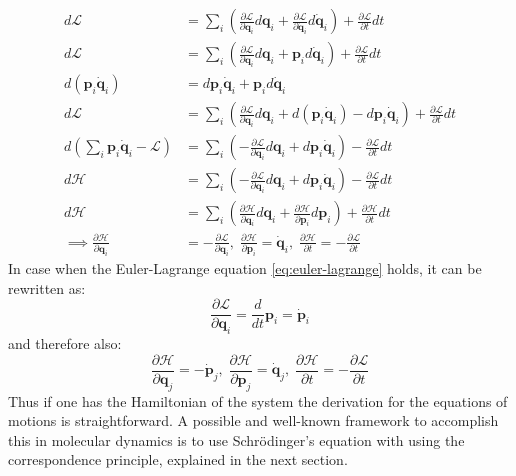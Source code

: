 \documentclass[12pt]{scrartcl}
\begin{document}
\begin{align*}
d\mathcal{L} &= \sum_{i} \left(  \frac{\partial \mathcal{L}}{\partial \mathbf{q}_i}d\mathbf{q}_i + \frac{\partial \mathcal{L}}{\partial \dot{\mathbf{q}}_i}d\dot{\mathbf{q}}_i  \right) + \frac{\partial \mathcal{L}}{\partial t} dt\\
d\mathcal{L} &= \sum_{i} \left(  \frac{\partial \mathcal{L}}{\partial \mathbf{q}_i}d\mathbf{q}_i + \mathbf{p}_id\dot{\mathbf{q}}_i  \right) + \frac{\partial \mathcal{L}}{\partial t} dt\\
d(\mathbf{p}_i\dot{\mathbf{q}}_i) &= d\mathbf{p}_i\dot{\mathbf{q}}_i+ \mathbf{p}_id\dot{\mathbf{q}}_i\\
d\mathcal{L} &= \sum_{i} \left(  \frac{\partial \mathcal{L}}{\partial \mathbf{q}_i}d\mathbf{q}_i +d(\mathbf{p}_i\dot{\mathbf{q}}_i) -  d\mathbf{p}_i\dot{\mathbf{q}}_i \right) + \frac{\partial \mathcal{L}}{\partial t} dt\\
d(\sum_{i} \mathbf{p}_i\dot{\mathbf{q}}_i - \mathcal{L})&=\sum_{i}\left(-\frac{\partial \mathcal{L}}{\partial \mathbf{q}_i}d\mathbf{q}_i +d\mathbf{p}_i\dot{\mathbf{q}}_i  \right)-\frac{\partial \mathcal{L}}{\partial t} dt \\
d\mathcal{H}&=\sum_{i}\left(-\frac{\partial \mathcal{L}}{\partial \mathbf{q}_i}d\mathbf{q}_i +d\mathbf{p}_i\dot{\mathbf{q}}_i  \right)-\frac{\partial \mathcal{L}}{\partial t} dt \\
d\mathcal{H}&=\sum_{i} \left(  \frac{\partial \mathcal{H}}{\partial \mathbf{q}_i}d\mathbf{q}_i + \frac{\partial \mathcal{H}}{\partial \mathbf{p}_i}d\mathbf{p}_i  \right) + \frac{\partial \mathcal{H}}{\partial t} dt\\
\implies \frac{\partial \mathcal{H}}{\partial \mathbf{q}_i}&=-\frac{\partial \mathcal{L}}{\partial \mathbf{q}_i},\;
\frac{\partial \mathcal{H}}{\partial \mathbf{p}_i}=\dot{\mathbf{q}}_i,\;
\frac{\partial \mathcal{H}}{\partial t}=-\frac{\partial \mathcal{L}}{\partial t}
\end{align*}
In case when the Euler-Lagrange equation \ref{eq:euler-lagrange} holds, it can be rewritten as:
\begin{equation}
\frac{\partial \mathcal{L}}{\partial \mathbf{q}_i} = \frac{d}{dt}\mathbf{p}_i=\dot{\mathbf{p}}_i
\end{equation}
and therefore also:
\begin{equation}
\frac{\partial \mathcal{H}}{\partial \mathbf{q}_j}=-\dot{\mathbf{p}}_j,\;\frac{\partial \mathcal{H}}{\partial \mathbf{p}_j}=\dot{\mathbf{q}}_j,\;\frac{\partial \mathcal{H}}{\partial t}=-\frac{\partial \mathcal{L}}{\partial t}
\end{equation}
Thus if one has the Hamiltonian of the system the derivation for the equations of motions is straightforward. A possible and well-known framework to accomplish this in molecular dynamics is to use Schr\"odinger's equation with using the correspondence principle, explained in the next section.
\end{document}
